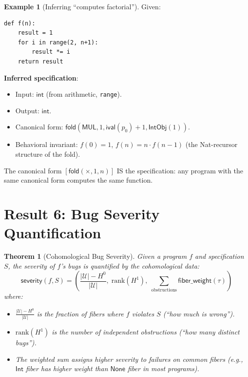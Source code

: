 \documentclass[11pt,a4paper]{report}
\theoremstyle{definition}
\newtheorem{example}[definition]{Example}
\theoremstyle{plain}
\newtheorem{theorem}[definition]{Theorem}
\newcommand{\fold}{\mathsf{fold}}
\newcommand{\covers}{\mathcal{U}}
\newcommand{\Hzero}{H^0}
\newcommand{\Hone}{H^1}
\begin{document}
\begin{example}[Inferring ``computes factorial'']
Given:
\begin{lstlisting}
def f(n):
    result = 1
    for i in range(2, n+1):
        result *= i
    return result
\end{lstlisting}

\textbf{Inferred specification}:
\begin{itemize}
  \item Input: $\mathsf{int}$ (from arithmetic, \texttt{range}).
  \item Output: $\mathsf{int}$.
  \item Canonical form: $\fold(\mathsf{MUL}, 1, \mathsf{ival}(p_0)+1,
    \mathsf{IntObj}(1))$.
  \item Behavioral invariant: $f(0) = 1$, $f(n) = n \cdot f(n-1)$
    (the Nat-recursor structure of the fold).
\end{itemize}

The canonical form $[\fold(\times, 1, n)]$ IS the specification:
any program with the same canonical form computes the same function.
\end{example}

\section{Result 6: Bug Severity Quantification}

\begin{theorem}[Cohomological Bug Severity]
\label{thm:bug-severity}
Given a program $f$ and specification $S$, the \emph{severity} of
$f$'s bugs is quantified by the cohomological data:
\[
  \mathsf{severity}(f, S) = \left(\frac{|\covers| - \Hzero}{|\covers|},\;
    \mathrm{rank}(\Hone),\;
    \sum_{\text{obstructions}} \mathsf{fiber\_weight}(\tau)\right)
\]
where:
\begin{itemize}
  \item $\frac{|\covers| - \Hzero}{|\covers|}$ is the fraction of
    fibers where $f$ violates $S$ (``how much is wrong'').
  \item $\mathrm{rank}(\Hone)$ is the number of independent
    obstructions (``how many distinct bugs'').
  \item The weighted sum assigns higher severity to failures on
    common fibers (e.g., $\mathsf{Int}$ fiber has higher weight
    than $\mathsf{None}$ fiber in most programs).
\end{itemize}
\end{theorem}
\end{document}
